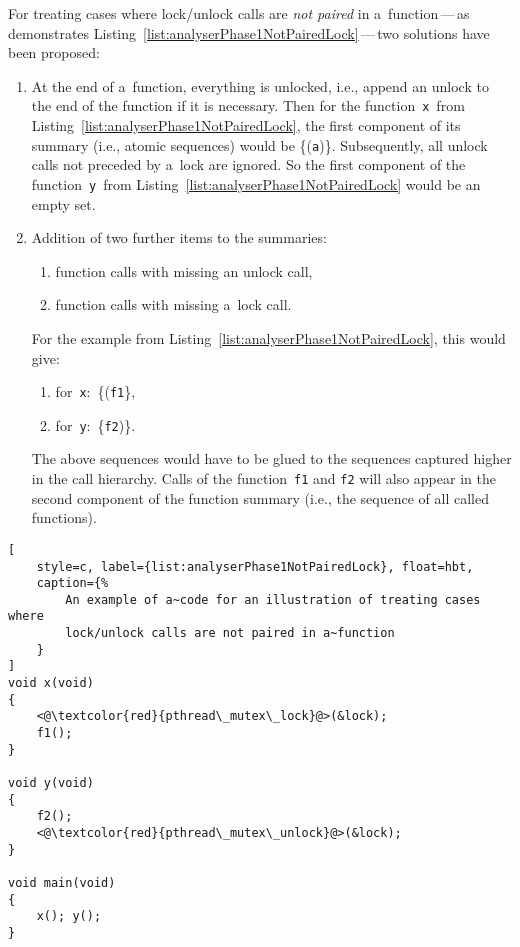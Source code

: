 For treating cases where lock/unlock calls are \emph{not paired} in
a~function\,---\,as demonstrates 
Listing~\ref{list:analyserPhase1NotPairedLock}\,---\,two solutions
have been proposed:
\begin{enumerate}
    \item
        At the end of a~function, everything is unlocked, i.e., append
        an unlock to the end of the function if it is necessary. Then
        for the function~\texttt{x}~from
        Listing~\ref{list:analyserPhase1NotPairedLock}, the first component
        of its summary (i.e., atomic sequences) would be \{(\texttt{a})\}.
        Subsequently, all unlock calls not preceded by a~lock are
        ignored. So the first component of the function~\texttt{y}~from
        Listing~\ref{list:analyserPhase1NotPairedLock} would be an
        empty set.
    
    \item
        Addition of two further items to the summaries:
        \begin{enumerate}[label={(\alph*)}]
            \item
                function calls with missing an unlock call,

            \item
                function calls with missing a~lock call.
        \end{enumerate}
        For the example from Listing~\ref{list:analyserPhase1NotPairedLock},
        this would give:
        \begin{enumerate}[label={(\alph*)}]
            \item
                for~\texttt{x}:~\{(\texttt{f1}\},

            \item
                for~\texttt{y}:~\{\texttt{f2})\}.
        \end{enumerate}
        The above sequences would have to be glued to the sequences
        captured higher in the call hierarchy. Calls of the
        function~\texttt{f1} and \texttt{f2} will also appear in
        the second component of the function summary (i.e., the sequence
        of all called functions).
\end{enumerate}

\begin{lstlisting}[
    style=c, label={list:analyserPhase1NotPairedLock}, float=hbt,
    caption={%
        An example of a~code for an illustration of treating cases where
        lock/unlock calls are not paired in a~function
    }
]
void x(void)
{
    <@\textcolor{red}{pthread\_mutex\_lock}@>(&lock);
    f1();
}

void y(void)
{
    f2();
    <@\textcolor{red}{pthread\_mutex\_unlock}@>(&lock);
}

void main(void)
{
    x(); y();
}
\end{lstlisting}


